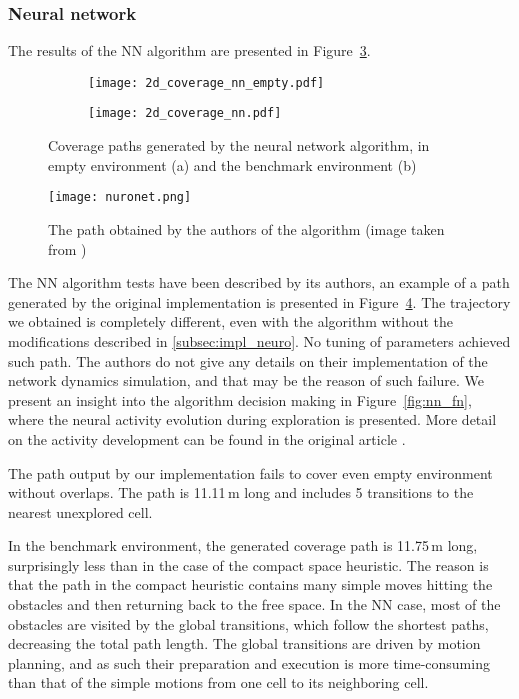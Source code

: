 \documentclass[buriama8_dp.tex]{subfiles}
\begin{document}
\subsubsection{Neural network}
The results of the NN algorithm are presented in Figure~\ref{fig:nn_2d_coverage}.

\begin{figure}[htp]
  \centering
  \begin{subfigure}[t]{0.49\textwidth}
    \texttt{[image: 2d\_coverage\_nn\_empty.pdf]}
    \caption{}
    \label{fig:nn_2d_empty}
  \end{subfigure}
  \begin{subfigure}[t]{0.49\textwidth}
    \texttt{[image: 2d\_coverage\_nn.pdf]}
    \caption{}
    \label{fig:nn_2d_env}
  \end{subfigure}

  \caption[Coverage path -- neural network in 2D]{Coverage paths generated by the neural network algorithm, in empty environment (a) and the benchmark environment (b)}
  \label{fig:nn_2d_coverage}
\end{figure}

\begin{figure}[htp]
  \centering
  \texttt{[image: nuronet.png]}
  \caption{The path obtained by the authors of the algorithm (image taken from \cite{neural})}
  \label{fig:nn_article}
\end{figure}

The NN algorithm tests have been described by its authors, an example of a path generated by the original implementation is presented in Figure~\ref{fig:nn_article}. The trajectory we obtained is completely different, even with the algorithm without the modifications described in \ref{subsec:impl_neuro}. No tuning of parameters achieved such path. The authors do not give any details on their implementation of the network dynamics simulation, and that may be the reason of such failure. We present an insight into the algorithm decision making in Figure~\ref{fig:nn_fn}, where the neural activity evolution during exploration is presented. More detail on the activity development can be found in the original article \cite{neural}. 

The path output by our implementation fails to cover even empty environment without overlaps. The path is 11.11\,m long and includes 5 transitions to the nearest unexplored cell.

In the benchmark environment, the generated coverage path is 11.75\,m long, surprisingly less than in the case of the compact space heuristic. The reason is that the path in the compact heuristic contains many simple moves hitting the obstacles and then returning back to the free space. In the NN case, most of the obstacles are visited by the global transitions, which follow the shortest paths, decreasing the total path length. The global transitions are driven by motion planning, and as such their preparation and execution is more time-consuming than that of the simple motions from one cell to its neighboring cell.
\end{document}
